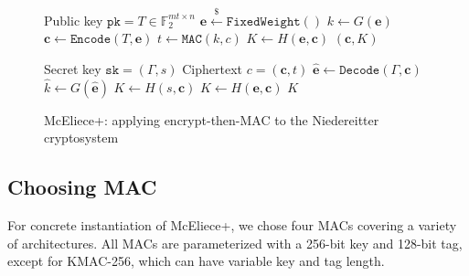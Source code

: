 \documentclass[runningheads]{llncs}
\newcommand{\encap}{\texttt{Encap}}
\newcommand{\decap}{\texttt{Decap}}
\newcommand{\mac}{\texttt{MAC}}
\newcommand{\pk}{\texttt{pk}}
\newcommand{\sk}{\texttt{sk}}
\newcommand{\leftsample}{\stackrel{\$}{\leftarrow}}
\begin{document}
\begin{figure}[h]
    \centering
    
    \begin{minipage}[t]{0.48\textwidth}
        \begin{algorithm}[H]
            \caption{$\encap_\text{McEliece+}(\pk)$}
            \begin{algorithmic}[1]
                \Require Public key $\pk = T \in\mathbb{F}_2^{mt \times n}$
                \State $\mathbf{e} \leftsample \texttt{FixedWeight}()$
                \State $k \leftarrow G(\mathbf{e})$
                \State $\mathbf{c} \leftarrow \texttt{Encode}(T, \mathbf{e})$
                \State $t \leftarrow \mac(k, c)$
                \State $K \leftarrow H(\mathbf{e}, \mathbf{c})$
                \State \Return $(\mathbf{c}, K)$
            \end{algorithmic}
        \end{algorithm}
    \end{minipage}\hfill
    \begin{minipage}[t]{0.48\textwidth}
        \begin{algorithm}[H]
            \caption{$\decap_\text{McEliece+}(\sk, c)$}
            \begin{algorithmic}[1]
                \Require Secret key $\sk = (\Gamma, s)$
                \Require Ciphertext $c = (\mathbf{c}, t)$
                \State $\hat{\mathbf{e}} \leftarrow \texttt{Decode}(\Gamma, \mathbf{c})$
                \State $\hat{k} \leftarrow G(\hat{\mathbf{e}})$
                \If{$\mac(\hat{k}, \mathbf{c}) \neq t$}
                    \State $K \leftarrow H(s, \mathbf{c})$
                \Else
                    \State $K \leftarrow H(\mathbf{e}, \mathbf{c})$
                \EndIf
                \State\Return $K$
            \end{algorithmic}
        \end{algorithm}
    \end{minipage}

    \caption{McEliece+: applying encrypt-then-MAC to the Niedereitter cryptosystem}\label{fig:mceliece-plus}
\end{figure}

\subsection{Choosing MAC}\label{sec:choosing-mac}
For concrete instantiation of McEliece+, we chose four MACs covering a variety of architectures. All MACs are parameterized with a 256-bit key and 128-bit tag, except for KMAC-256, which can have variable key and tag length.
\end{document}
